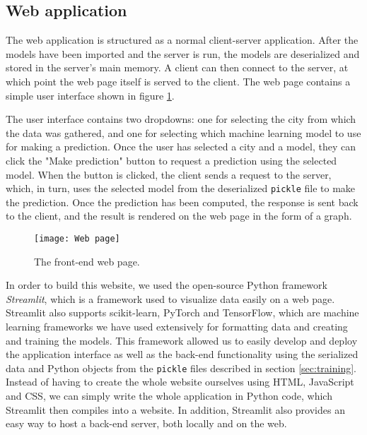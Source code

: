 \subsection{Web application}\label{sec:web app}
The web application is structured as a normal client-server application. 
After the models have been imported and the server is run, the models are deserialized and stored in the server's main memory.
A client can then connect to the server, at which point the web page itself is served to the client.
The web page contains a simple user interface shown in figure \ref{fig:web page}.

The user interface contains two dropdowns: one for selecting the city from which the data was gathered, and one for selecting which machine learning model to use for making a prediction.
Once the user has selected a city and a model, they can click the "Make prediction" button to request a prediction using the selected model.
When the button is clicked, the client sends a request to the server, which, in turn, uses the selected model from the deserialized \texttt{pickle} file to make the prediction. 
Once the prediction has been computed, the response is sent back to the client, and the result is rendered on the web page in the form of a graph.

\begin{figure}[t]
	\centering
	\texttt{[image: Web page]}
	\caption{The front-end web page.}
	\label{fig:web page}
\end{figure}

In order to build this website, we used the open-source Python framework \textit{Streamlit}\cite{streamlit}, which is a framework used to visualize data easily on a web page.
Streamlit also supports scikit-learn\cite{scikit-learn}, PyTorch\cite{pytorch} and TensorFlow\cite{tensorflow}, which are machine learning frameworks we have used extensively for formatting data and creating and training the models.
This framework allowed us to easily develop and deploy the application interface as well as the back-end functionality using the serialized data and Python objects from the \texttt{pickle} files described in section \ref{sec:training}.
Instead of having to create the whole website ourselves using HTML, JavaScript and CSS, we can simply write the whole application in Python code, which Streamlit then compiles into a website.
In addition, Streamlit also provides an easy way to host a back-end server, both locally and on the web.
